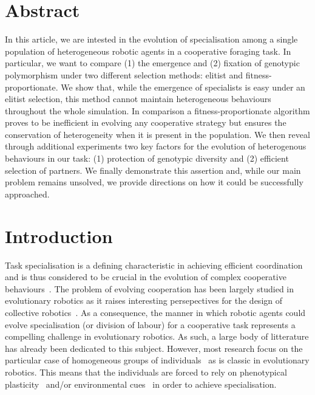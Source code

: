 \section{Abstract}
  In this article, we are intested in the evolution of specialisation among a single population of heterogeneous robotic agents in a cooperative foraging task. In particular, we want to compare (1) the emergence and (2) fixation of genotypic polymorphism under two different selection methods: elitist and fitness-proportionate. We show that, while the emergence of specialists is easy under an elitist selection, this method cannot maintain heterogeneous behaviours throughout the whole simulation. In comparison a fitness-proportionate algorithm proves to be inefficient in evolving any cooperative strategy but ensures the conservation of heterogeneity when it is present in the population. We then reveal through additional experiments two key factors for the evolution of heterogenous behaviours in our task: (1) protection of genotypic diversity and (2) efficient selection of partners. We finally demonstrate this assertion and, while our main problem remains unsolved, we provide directions on how it could be successfully approached.


\section{Introduction}
  Task specialisation is a defining characteristic in achieving efficient coordination and is thus considered to be crucial in the evolution of complex cooperative behaviours~\parencite{Eors1995}. The problem of evolving cooperation has been largely studied in evolutionary robotics as it raises interesting persepectives for the design of collective robotics~\parencite{Trianni2007, Hauert2014, Doncieux2015a}. As a consequence, the manner in which robotic agents could evolve specialisation (or division of labour) for a cooperative task represents a compelling challenge in evolutionary robotics. As such, a large body of litterature has already been dedicated to this subject. However, most research focus on the particular case of homogeneous groups of individuals~\parencite{Waibel2009} as is classic in evolutionary robotics. This means that the individuals are forced to rely on phenotypical plasticity~\parencite{Waibel2006, Ferrante2015, Eskridge2015} and/or environmental cues~\parencite{Waibel2006, Goldsby2010} in order to achieve specialisation.

